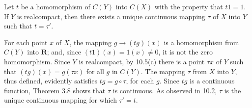 Let $t$ be a homomorphism of $C(Y)$ into $C(X)$ with the property
that $t1 = 1$. If $Y$ is realcompact, then there exists a unique
continuous mapping $\tau$ of $X$ into $Y$ such that $t = \tau'$.

For each point $x$ of $X$, the mapping $g \rightarrow (tg)(x)$
is a homomorphism from $C(Y)$ into $\mathbf{R}$;
and, since $(t1)(x) = 1(x) \neq 0$, it is not the zero homomorphism.
Since $Y$ is realcompact, by 10.5(c) there is a point
$\tau x$ of $Y$ such that $(tg)(x) = g(\tau x)$
for all $g$ in $C(Y)$.
The mapping $\tau$ from $X$ into $Y$, thus defined,
evidently satisfies $tg = g \circ \tau$, for each $g$.
Since $tg$ is a continuous function,
Theorem 3.8 shows that $\tau$ is continuous.
As observed in 10.2, $\tau$ is the unique continuous mapping
for which $\tau' = t$.
